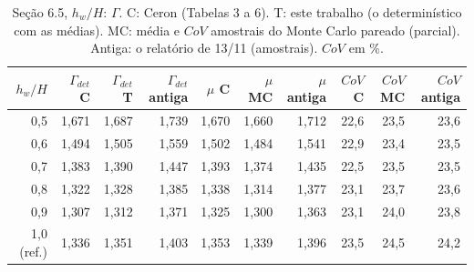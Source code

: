 \begin{table}[htbp]\centering\scriptsize\setlength{\tabcolsep}{3pt}
\caption{Seção 6.5, $h_w/H$: $\Gamma$. C: Ceron (Tabelas 3 a 6). T: este trabalho (o determinístico com as médias). MC: média e $CoV$ amostrais do Monte Carlo pareado (parcial). Antiga: o relatório de 13/11 (amostrais). $CoV$ em \%.}\label{tab:g_hw}
\begin{tabular}{rrrrrrrrrr}\toprule
$h_w/H$ & $\Gamma_{det}$ C & $\Gamma_{det}$ T & $\Gamma_{det}$ antiga & $\mu$ C & $\mu$ MC & $\mu$ antiga & $CoV$ C & $CoV$ MC & $CoV$ antiga \\\midrule
0{,}5 & 1{,}671 & 1{,}687 & 1{,}739 & 1{,}670 & 1{,}660 & 1{,}712 & 22{,}6 & 23{,}5 & 23{,}6 \\
0{,}6 & 1{,}494 & 1{,}505 & 1{,}559 & 1{,}502 & 1{,}484 & 1{,}541 & 22{,}9 & 23{,}4 & 23{,}5 \\
0{,}7 & 1{,}383 & 1{,}390 & 1{,}447 & 1{,}393 & 1{,}374 & 1{,}435 & 22{,}5 & 23{,}5 & 23{,}5 \\
0{,}8 & 1{,}322 & 1{,}328 & 1{,}385 & 1{,}338 & 1{,}314 & 1{,}377 & 23{,}1 & 23{,}7 & 23{,}6 \\
0{,}9 & 1{,}307 & 1{,}312 & 1{,}371 & 1{,}325 & 1{,}300 & 1{,}363 & 23{,}1 & 24{,}0 & 23{,}8 \\
1{,}0 (ref.) & 1{,}336 & 1{,}351 & 1{,}403 & 1{,}353 & 1{,}339 & 1{,}396 & 23{,}5 & 24{,}5 & 24{,}2 \\
\bottomrule\end{tabular}\end{table}
